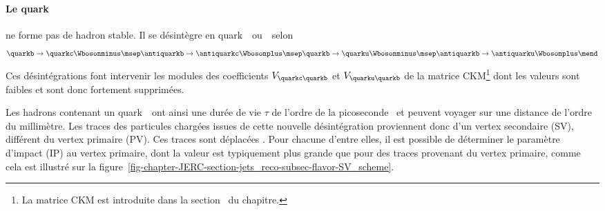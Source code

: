 \paragraph{Le quark~\quarkb} ne forme pas de hadron stable. Il se désintègre en quark~\quarkc\ ou~\quarku\ selon
\begin{equation}
\quarkb \to \quarkc\Wbosonminus
\msep
\antiquarkb \to \antiquarkc\Wbosonplus
\msep
\quarkb \to \quarku\Wbosonminus
\msep
\antiquarkb \to \antiquarku\Wbosonplus
\mend
\end{equation}
Ces désintégrations font intervenir les modules des coefficients $V_{\quarkc\quarkb}$ et $V_{\quarku\quarkb}$ de la matrice CKM\footnote{La matrice CKM est introduite dans la section~ du chapitre.} dont les valeurs sont faibles et sont donc fortement supprimées.
\par Les hadrons contenant un quark~\quarkb\ ont ainsi une durée de vie $\tau$ de l'ordre de la picoseconde~\cite{B0s_lifetime,lifetimes_c_b_hadrons} et peuvent voyager sur une distance de l'ordre du millimètre.
Les traces des particules chargées issues de cette nouvelle désintégration proviennent donc d'un vertex secondaire (SV), différent du vertex primaire (PV).
Ces traces sont \og déplacées \fg.
Pour chacune d'entre elles, il est possible de déterminer le paramètre d'impact (IP) au vertex primaire, dont la valeur est typiquement plus grande que pour des traces provenant du vertex primaire, comme cela est illustré sur la figure~\ref{fig-chapter-JERC-section-jets_reco-subsec-flavor-SV_scheme}.
